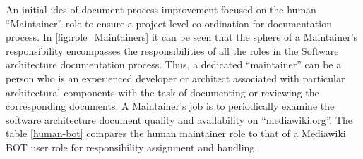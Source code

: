 \begin{enumerate}
An initial ides of document process improvement focused on the human \enquote{Maintainer} role to ensure a project-level co-ordination for documentation process. In \autoref{fig:role_Maintainers} it can be seen that the sphere of a Maintainer's responsibility encompasses the responsibilities of all the roles in the Software architecture documentation process. Thus, a dedicated \enquote{maintainer} can be a person who is an experienced developer or architect associated with particular architectural components with the task of documenting or reviewing the corresponding documents. A Maintainer's job is to periodically examine the software architecture document quality and availability on \enquote{mediawiki.org}. The table \autoref{human-bot} compares the human maintainer role to that of a Mediawiki BOT user role for responsibility assignment and handling.



\end{enumerate}

